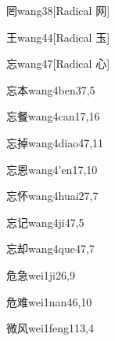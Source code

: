 \begin{verbete}{罔}{wang3}{8}[Radical 网]
\end{verbete}

\begin{verbete}{王}{wang4}{4}[Radical 玉]
\end{verbete}

\begin{verbete}{忘}{wang4}{7}[Radical 心]
\end{verbete}

\begin{verbete}{忘本}{wang4ben3}{7,5}
\end{verbete}

\begin{verbete}{忘餐}{wang4can1}{7,16}
\end{verbete}

\begin{verbete}{忘掉}{wang4diao4}{7,11}
\end{verbete}

\begin{verbete}{忘恩}{wang4'en1}{7,10}
\end{verbete}

\begin{verbete}{忘怀}{wang4huai2}{7,7}
\end{verbete}

\begin{verbete}{忘记}{wang4ji4}{7,5}
\end{verbete}

\begin{verbete}{忘却}{wang4que4}{7,7}
\end{verbete}

\begin{verbete}{危急}{wei1ji2}{6,9}
\end{verbete}

\begin{verbete}{危难}{wei1nan4}{6,10}
\end{verbete}

\begin{verbete}{微风}{wei1feng1}{13,4}
\end{verbete}


